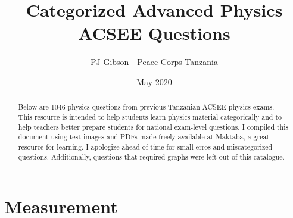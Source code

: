 \documentclass{article}
\title{Categorized Advanced Physics ACSEE Questions}
\author{PJ Gibson - Peace Corps Tanzania}
\date{May 2020}
\begin{document}
\maketitle

\begin{abstract}

Below are 1046 physics questions from previous Tanzanian ACSEE physics exams.  This resource is intended to help students learn physics material categorically and to help teachers better prepare students for national exam-level questions. I compiled this document using test images and PDFs made freely available at Maktaba, a great resource for learning.  I apologize ahead of time for small erros and miscategorized questions.  Additionally, questions that required graphs were left out of this catalogue.  

\end{abstract}

\section{Measurement}
\end{document}

